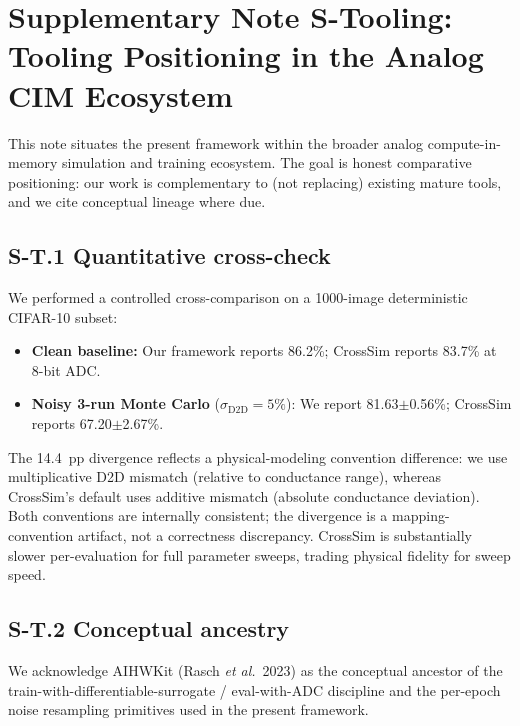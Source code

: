 
\section*{Supplementary Note S-Tooling: Tooling Positioning in the Analog CIM Ecosystem}
\label{supp:tooling}

This note situates the present framework within the broader analog compute-in-memory simulation and training ecosystem. The goal is honest comparative positioning: our work is complementary to (not replacing) existing mature tools, and we cite conceptual lineage where due.

\subsection*{S-T.1 Quantitative cross-check}

We performed a controlled cross-comparison on a 1000-image deterministic CIFAR-10 subset:

\begin{itemize}
    \item \textbf{Clean baseline:} Our framework reports 86.2\%; CrossSim reports 83.7\% at 8-bit ADC.
    \item \textbf{Noisy 3-run Monte Carlo} ($\sigma_{\text{D2D}} = 5\%$): We report 81.63$\pm$0.56\%; CrossSim reports 67.20$\pm$2.67\%.
\end{itemize}

The 14.4~pp divergence reflects a physical-modeling convention difference: we use multiplicative D2D mismatch (relative to conductance range), whereas CrossSim's default uses additive mismatch (absolute conductance deviation). Both conventions are internally consistent; the divergence is a mapping-convention artifact, not a correctness discrepancy. CrossSim is substantially slower per-evaluation for full parameter sweeps, trading physical fidelity for sweep speed.

\subsection*{S-T.2 Conceptual ancestry}

We acknowledge AIHWKit (Rasch \emph{et al.}\ 2023) as the conceptual ancestor of the train-with-differentiable-surrogate / eval-with-ADC discipline and the per-epoch noise resampling primitives used in the present framework.

